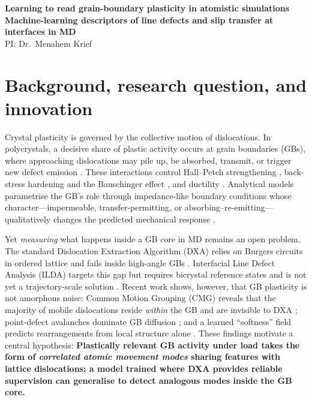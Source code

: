\documentclass[11pt]{article}
\begin{document}
\begin{center}
{\Large \textbf{Learning to read grain-boundary plasticity in atomistic simulations}}\\[0.15em]
{\large \textbf{Machine-learning descriptors of line defects and slip transfer at interfaces in MD}}\\[0.25em]
{\normalsize PI: Dr.\ Menahem Krief}\\[0.15em]
\end{center}

\section*{Background, research question, and innovation}

Crystal plasticity is governed by the collective motion of dislocations.
In polycrystals, a decisive share of plastic activity occurs at grain boundaries (GBs), where approaching dislocations may pile up, be absorbed, transmit, or trigger new defect emission \cite{Piao2022,Liu2020,DGI2025}.
These interactions control Hall--Petch strengthening \cite{Cordero2016}, back-stress hardening and the Bauschinger effect \cite{Gao2022,LeBauschinger2018,Piao2022}, and ductility \cite{Liu2020}.
Analytical models parametrise the GB's role through impedance-like boundary conditions whose character---impermeable, transfer-permitting, or absorbing--re-emitting---qualitatively changes the predicted mechanical response \cite{Piao2022,LeBauschinger2018}.

Yet \emph{measuring} what happens inside a GB core in MD remains an open problem.
The standard Dislocation Extraction Algorithm (DXA) relies on Burgers circuits in ordered lattice and fails inside high-angle GBs \cite{OVITODXA}.
Interfacial Line Defect Analysis (ILDA) targets this gap but requires bicrystal reference states and is not yet a trajectory-scale solution \cite{Deka2023}.
Recent work shows, however, that GB plasticity is not amorphous noise: Common Motion Grouping (CMG) reveals that the majority of mobile dislocations reside \emph{within} the GB and are invisible to DXA \cite{Firman2024}; point-defect avalanches dominate GB diffusion \cite{Chesser2022}; and a learned ``softness'' field predicts rearrangements from local structure alone \cite{Sharp2018}.
These findings motivate a central hypothesis:
\textbf{Plastically relevant GB activity under load takes the form of \emph{correlated atomic movement modes} sharing features with lattice dislocations; a model trained where DXA provides reliable supervision can generalise to detect analogous modes inside the GB core.}
\end{document}
